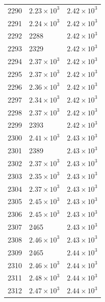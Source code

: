 \begin{table}[H]
\begin{tabular}{lll}
2290 & $\displaystyle 2.23 \times 10^{3}$ & $\displaystyle 2.42 \times 10^{3}$ \\
2291 & $\displaystyle 2.24 \times 10^{3}$ & $\displaystyle 2.42 \times 10^{3}$ \\
2292 & 2288 & $\displaystyle 2.42 \times 10^{3}$ \\
2293 & 2329 & $\displaystyle 2.42 \times 10^{3}$ \\
2294 & $\displaystyle 2.37 \times 10^{3}$ & $\displaystyle 2.42 \times 10^{3}$ \\
2295 & $\displaystyle 2.37 \times 10^{3}$ & $\displaystyle 2.42 \times 10^{3}$ \\
2296 & $\displaystyle 2.36 \times 10^{3}$ & $\displaystyle 2.42 \times 10^{3}$ \\
2297 & $\displaystyle 2.34 \times 10^{3}$ & $\displaystyle 2.42 \times 10^{3}$ \\
2298 & $\displaystyle 2.37 \times 10^{3}$ & $\displaystyle 2.42 \times 10^{3}$ \\
2299 & 2393 & $\displaystyle 2.42 \times 10^{3}$ \\
2300 & $\displaystyle 2.41 \times 10^{3}$ & $\displaystyle 2.43 \times 10^{3}$ \\
2301 & 2389 & $\displaystyle 2.43 \times 10^{3}$ \\
2302 & $\displaystyle 2.37 \times 10^{3}$ & $\displaystyle 2.43 \times 10^{3}$ \\
2303 & $\displaystyle 2.35 \times 10^{3}$ & $\displaystyle 2.43 \times 10^{3}$ \\
2304 & $\displaystyle 2.37 \times 10^{3}$ & $\displaystyle 2.43 \times 10^{3}$ \\
2305 & $\displaystyle 2.45 \times 10^{3}$ & $\displaystyle 2.43 \times 10^{3}$ \\
2306 & $\displaystyle 2.45 \times 10^{3}$ & $\displaystyle 2.43 \times 10^{3}$ \\
2307 & 2465 & $\displaystyle 2.43 \times 10^{3}$ \\
2308 & $\displaystyle 2.46 \times 10^{3}$ & $\displaystyle 2.43 \times 10^{3}$ \\
2309 & 2465 & $\displaystyle 2.44 \times 10^{3}$ \\
2310 & $\displaystyle 2.46 \times 10^{3}$ & $\displaystyle 2.44 \times 10^{3}$ \\
2311 & $\displaystyle 2.48 \times 10^{3}$ & $\displaystyle 2.44 \times 10^{3}$ \\
2312 & $\displaystyle 2.47 \times 10^{3}$ & $\displaystyle 2.44 \times 10^{3}$ \\

\end{tabular}
\end{table}
